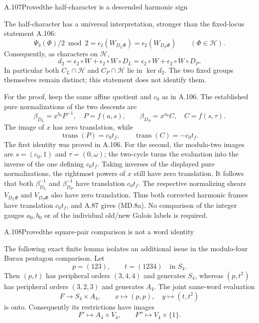 \begin{statement}{A.107}{Proved}{the half-character is a descended harmonic sign}
\end{statement}
The half-character has a universal interpretation, stronger than
the fixed-locus statement A.106:
\[
 \boxed{\quad
 \Psi_3(\Phi)/2\bmod2
 =\epsilon_2(W_{D_L\Phi})
 =\epsilon_2(W_{D_P\Phi})
 \qquad(\Phi\in\mathcal H).
 \quad}
 \tag{MD.8a}
\]
Consequently, as characters on $\mathcal H$,
\[
 d_2=\epsilon_2\circ W+\epsilon_2\circ W\circ D_L
     =\epsilon_2\circ W+\epsilon_2\circ W\circ D_P.
 \tag{MD.8b}
\]
In particular both $C_L\cap\mathcal H$ and
$C_P\cap\mathcal H$ lie in $\ker d_2$. The two fixed groups
themselves remain distinct; this statement does not identify them.

For the proof, keep the same affine quotient and $c_0$ as in A.106.
The established pure normalizations of the two descents are
\[
 \beta_{D_L}=x^{b_0}P^{-1},\quad P=f(a,s),\qquad
 \beta_{D_P}=x^{a_0}C,\quad C=f(s,\tau).
\]
The image of $x$ has zero translation, while
\[
 \operatorname{trans}(P)=c_0t_f,\qquad
 \operatorname{trans}(C)=-c_0t_f.
\]
The first identity was proved in A.106. For the second, the
modulo-two images are $s=(c_0,1)$ and $\tau=(0,\omega)$;
the two-cycle turns the evaluation into the inverse of the
one defining $c_0t_f$.
Taking inverses of the displayed pure normalizations, the
rightmost powers of $x$ still have zero translation. It follows
that both $\beta_{D_L}^{-1}$ and $\beta_{D_P}^{-1}$ have
translation $c_0t_f$. The respective normalizing shears
$V_{D_L\Phi}$ and $V_{D_P\Phi}$ also have zero translation.
Thus both corrected harmonic frames have translation $c_0t_f$,
and A.87 gives (MD.8a). No comparison of the integer gauges
$a_0,b_0$ or of the individual old/new Galois labels is required.

\begin{statement}{A.108}{Proved}{the square-pair comparison is not a word identity}
\end{statement}
The following exact finite lemma isolates an additional issue in
the modulo-four Burau pentagon comparison. Let
\[
 p=(123),\qquad t=(1234)\quad\text{in }S_4.
\]
Then $(p,t)$ has peripheral orders $(3,4,4)$ and generates $S_4$,
whereas $(p,t^2)$ has peripheral orders $(3,2,3)$ and generates
$A_4$. The joint same-word evaluation
\[
 F\longrightarrow S_4\times A_4,
 \qquad x\longmapsto(p,p),\quad y\longmapsto(t,t^2)
 \tag{MD.9a}
\]
is onto. Consequently its restrictions have images
\[
 F'\longmapsto A_4\times V_4,
 \qquad F''\longmapsto V_4\times\{1\}.
 \tag{MD.9b}
\]

